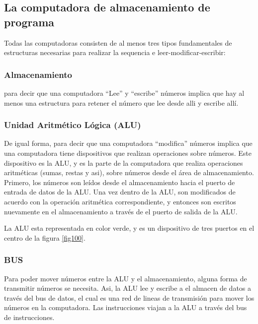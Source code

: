 \documentclass[12pt]{book}
\theoremstyle{definition}
\theoremstyle{remark}
\theoremstyle{plain}
\begin{document}
\subsection{La computadora de almacenamiento de programa}

Todas las computadoras consisten de al menos tres tipos fundamentales de estructuras necesarias para realizar la sequencia  e leer-modificar-escribir:

\subsubsection{Almacenamiento}

para decir que una computadora ``Lee'' y ``escribe'' números implica que hay al menos una estructura para retener el número que lee desde alli y escribe allí.

\subsubsection{Unidad Aritmético Lógica (ALU)}

De igual forma, para decir que una computadora ``modifica'' números implica que una computadora tiene dispositivos que realizan operaciones sobre números. Este dispositivo es la ALU, y es la parte de la  computadora que realiza operaciones aritméticas (sumas, restas y asi), sobre números desde el área de almacenamiento. Primero, los números son leídos desde el almacenamiento hacia el puerto de entrada de datos de la ALU. Una vez dentro de la ALU, son modificados de acuerdo con la operación aritmética correspondiente, y entonces son escritos nuevamente en el almacenamiento a través de el puerto de salida de la ALU.

La ALU esta representada en color verde, y es un dispositivo de tres puertos en el centro de la figura \ref{fig100}.


\subsubsection{BUS}

Para poder mover números entre la ALU y el almacenamiento, alguna forma de transmitir números se necesita. Asi, la ALU lee y escribe a el almacen de datos a través del bus de datos, el cual es una red de lineas de transmisión para mover los números en la computadora. Las instrucciones viajan a la ALU a través del bus de instrucciones.
\end{document}

